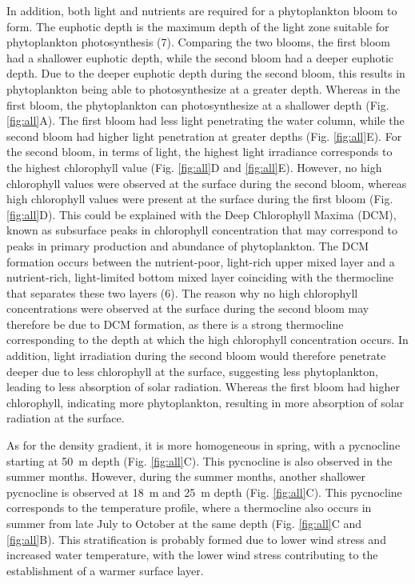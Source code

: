 \documentclass[../Main.tex]{subfiles}
\begin{document}
In addition, both light and nutrients are required for a phytoplankton bloom to form\supercite{munkes2021cyanobacteria}. The euphotic depth is the maximum depth of the light zone suitable for phytoplankton photosynthesis (7). Comparing the two blooms, the first bloom had a shallower euphotic depth, while the second bloom had a deeper euphotic depth. Due to the deeper euphotic depth during the second bloom, this results in phytoplankton being able to photosynthesize at a greater depth. Whereas in the first bloom, the phytoplankton can photosynthesize at a shallower depth  (Fig. \ref{fig:all}A). The first bloom had less light penetrating the water column, while the second bloom had higher light penetration at greater depths (Fig. \ref{fig:all}E). 
For the second bloom, in terms of light, the highest light irradiance corresponds to the highest chlorophyll value (Fig. \ref{fig:all}D and \ref{fig:all}E). 
However, no high chlorophyll values were observed at the surface during the second bloom, whereas high chlorophyll values were present at the surface during the first bloom (Fig. \ref{fig:all}D). This could be explained with the Deep Chlorophyll Maxima (DCM), known as subsurface peaks in chlorophyll concentration that may correspond to peaks in primary production and abundance of phytoplankton. The DCM formation occurs between the nutrient-poor, light-rich upper mixed layer and a nutrient-rich, light-limited bottom mixed layer coinciding with the thermocline that separates these two layers (6). The reason why no high chlorophyll concentrations were observed at the surface during the second bloom may therefore be due to DCM formation, as there is a strong thermocline corresponding to the depth at which the high chlorophyll concentration occurs. In addition, light irradiation during the second bloom would therefore penetrate deeper due to less chlorophyll at the surface, suggesting less phytoplankton, leading to less absorption of solar radiation. Whereas the first bloom had higher chlorophyll, indicating more phytoplankton, resulting in more absorption of solar radiation at the surface. 

As for the density gradient, it is more homogeneous in spring, with a pycnocline starting at \SI{50}{m} depth (Fig. \ref{fig:all}C). This pycnocline is also observed in the summer months. However, during the summer months, another shallower pycnocline is observed at \SI{18}{m} and \SI{25}{m} depth (Fig. \ref{fig:all}C). This pycnocline corresponds to the temperature profile, where a thermocline also occurs in summer from late July to October at the same depth (Fig. \ref{fig:all}C and \ref{fig:all}B). This stratification is probably formed due to lower wind stress and increased water temperature, with the lower wind stress contributing to the establishment of a warmer surface layer\supercite{carey2012eco}.
\end{document}
